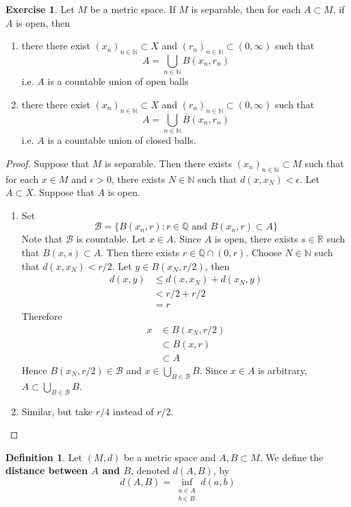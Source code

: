 \documentclass[12pt]{amsart}
\theoremstyle{definition}
\newtheorem{defn}[definition]{Definition}
\newtheorem{ex}[definition]{Exercise}
\newcommand{\ep}{\epsilon}
\newcommand{\N}{\mathbb{N}}
\newcommand{\R}{\mathbb{R}}
\newcommand{\Q}{\mathbb{Q}}
\newcommand{\MB}{\mathcal{B}}
\newcommand{\tbf}[1]{\textbf{#1}}
\DeclareMathOperator*{\0}{\mbf{0}}
\DeclareMathOperator*{\1}{\mbf{1}}
\newcommand{\ld}[1]{\label{defn:#1}}
\begin{document}
	\begin{ex}
		Let $M$ be a metric space. If $M$ is separable, then for each $A \subset M$, if $A$ is open, then 
		\begin{enumerate}
			\item there there exist $(x_n)_{n \in \N} \subset X$ and $(r_n)_{n \in \N} \subset (0, \infty)$ such that $$A = \bigcup\limits_{n \in \N} B(x_n, r_n)$$
			i.e. $A$ is a countable union of open balls
			\item there there exist $(x_n)_{n \in \N} \subset X$ and $(r_n)_{n \in \N} \subset (0, \infty)$ such that $$A = \bigcup\limits_{n \in \N} \bar{B}(x_n, r_n)$$
			i.e. $A$ is a countable union of closed balls.
		\end{enumerate}
	\end{ex}

	\begin{proof}
		Suppose that $M$ is separable. Then there exists $(x_n)_{n \in \N} \subset M$ such that for each $x \in M$ and $\ep >0$, there exists $N \in \N$ such that $d(x, x_N) < \ep$. Let $A \subset X$. Suppose that $A$ is open.
		\begin{enumerate}
			\item  Set 
			$$\MB = \{B(x_n, r): r \in \Q \text{ and } B(x_n, r) \subset A\}$$ 
			Note that $\MB$ is countable. Let $x \in A$. Since $A$ is open, there exists $s \in \R$ such that $B(x, s) \subset A$. Then there exists  $r \in \Q \cap (0, r)$. Choose $N \in \N$ such that $d(x, x_N) < r/2$. Let $y \in B(x_N, r/2)$, then 
			\begin{align*}
				d(x, y) 
				& \leq d(x, x_N) + d(x_N, y) \\
				& < r/2 + r/2 \\
				& = r
			\end{align*}
			Therefore 
			\begin{align*}
				x 
				& \in B(x_N, r/2) \\
				& \subset B(x, r) \\
				& \subset A
			\end{align*}
			Hence $B(x_N, r/2) \in \MB$ and $x \in \bigcup\limits_{B \in \MB}B$. Since $x \in A$ is arbitrary, $A \subset \bigcup\limits_{B \in \MB}B$.
			\item Similar, but take $r/4$ instead of $r/2$.
		\end{enumerate}
	\end{proof}
	
	\begin{defn} \ld{}
	Let $(M,d)$ be a metric space and $A,B \subset M$. We define the \tbf{distance between $A$ and $B$}, denoted $d(A,B)$, by $$d(A,B) = \inf_{\substack{a \in A \\ b \in B}} d(a,b)$$
	\end{defn}
	
\end{document}
